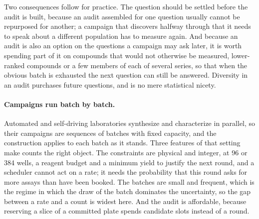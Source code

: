 \documentclass[twocolumn,10pt]{article}
\begin{document}
Two consequences follow for practice. The question should be settled before the audit is built, because an audit assembled for one question usually cannot be repurposed for another; a campaign that discovers halfway through that it needs to speak about a different population has to measure again. And because an audit is also an option on the questions a campaign may ask later, it is worth spending part of it on compounds that would not otherwise be measured, lower-ranked compounds or a few members of each of several series, so that when the obvious batch is exhausted the next question can still be answered. Diversity in an audit purchases future questions, and is no mere statistical nicety.

\paragraph{Campaigns run batch by batch.} Automated and self-driving laboratories synthesize and
characterize in parallel, so their campaigns are sequences of batches with fixed capacity, and
the construction applies to each batch as it stands. Three features of that setting make counts
the right object. The constraints are physical and integer, at 96 or 384 wells, a reagent budget and a minimum yield to justify the next round, and a scheduler cannot act on a rate; it needs the probability that this round asks for more assays than have been booked. The batches are small and frequent, which is the
regime in which the draw of the batch dominates the uncertainty, so the gap between a rate and a
count is widest here. And the audit is affordable, because reserving a slice of a committed plate spends candidate slots instead of a round.
\end{document}
